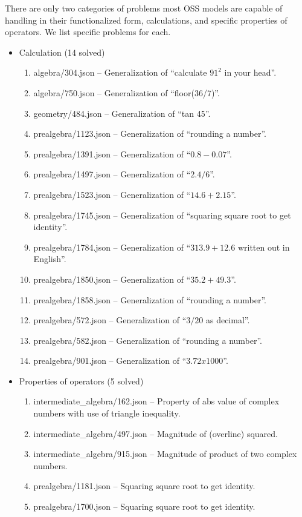\documentclass[11pt,a4paper]{article}
\begin{document}
There are only two categories of problems most OSS models are capable of handling in their
functionalized form, calculations, and specific properties of operators. We list specific problems for each.
\begin{itemize}
  \item Calculation (14 solved)
    \begin{enumerate}
      \item algebra/304.json -- Generalization of ``calculate $91^2$ in your head''.
      \item algebra/750.json -- Generalization of ``floor(36/7)''.
      \item geometry/484.json -- Generalization of ``tan 45''.
      \item prealgebra/1123.json -- Generalization of ``rounding a number''.
      \item prealgebra/1391.json -- Generalization of ``$0.8-0.07$''.
      \item prealgebra/1497.json -- Generalization of ``$2.4/6$''.
      \item prealgebra/1523.json -- Generalization of ``$14.6+2.15$''.
      \item prealgebra/1745.json -- Generalization of ``squaring square root to get identity''.
      \item prealgebra/1784.json -- Generalization of ``$313.9 + 12.6$ written out in English''.
      \item prealgebra/1850.json -- Generalization of ``$35.2 + 49.3$''.
      \item prealgebra/1858.json -- Generalization of ``rounding a number''.
      \item prealgebra/572.json -- Generalization of ``$3/20$ as decimal''.
      \item prealgebra/582.json -- Generalization of ``rounding a number''.
      \item prealgebra/901.json -- Generalization of ``$3.72 x 1000$''.
    \end{enumerate}

  \item Properties of operators (5 solved)
    \begin{enumerate}
      \item intermediate\_algebra/162.json -- Property of abs value of complex numbers with use of triangle inequality.
      \item intermediate\_algebra/497.json -- Magnitude of (overline) squared.
      \item intermediate\_algebra/915.json -- Magnitude of product of two complex numbers.
      \item prealgebra/1181.json -- Squaring square root to get identity.
      \item prealgebra/1700.json -- Squaring square root to get identity.
    \end{enumerate}

\end{itemize}
\end{document}
